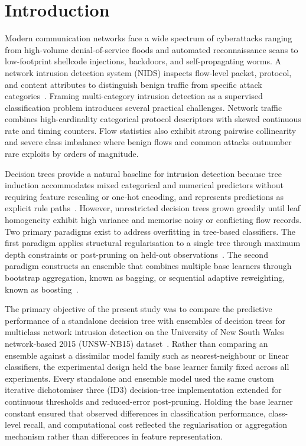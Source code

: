 \section{Introduction}
\label{sec:introduction}

Modern communication networks face a wide spectrum of cyberattacks ranging from high-volume denial-of-service floods and automated reconnaissance scans to low-footprint shellcode injections, backdoors, and self-propagating worms. A network intrusion detection system (NIDS) inspects flow-level packet, protocol, and content attributes to distinguish benign traffic from specific attack categories~\cite{Moustafa2015}. Framing multi-category intrusion detection as a supervised classification problem introduces several practical challenges. Network traffic combines high-cardinality categorical protocol descriptors with skewed continuous rate and timing counters. Flow statistics also exhibit strong pairwise collinearity and severe class imbalance where benign flows and common attacks outnumber rare exploits by orders of magnitude.

Decision trees provide a natural baseline for intrusion detection because tree induction accommodates mixed categorical and numerical predictors without requiring feature rescaling or one-hot encoding, and represents predictions as explicit rule paths~\cite{Kelleher2020,Quinlan1986}. However, unrestricted decision trees grown greedily until leaf homogeneity exhibit high variance and memorise noisy or conflicting flow records. Two primary paradigms exist to address overfitting in tree-based classifiers. The first paradigm applies structural regularisation to a single tree through maximum depth constraints or post-pruning on held-out observations~\cite{Kelleher2020,Quinlan1993}. The second paradigm constructs an ensemble that combines multiple base learners through bootstrap aggregation, known as bagging, or sequential adaptive reweighting, known as boosting~\cite{Breiman1996,Freund1997,Zhu2009}.

The primary objective of the present study was to compare the predictive performance of a standalone decision tree with ensembles of decision trees for multiclass network intrusion detection on the University of New South Wales network-based 2015 (UNSW-NB15) dataset~\cite{Moustafa2015}. Rather than comparing an ensemble against a dissimilar model family such as nearest-neighbour or linear classifiers, the experimental design held the base learner family fixed across all experiments. Every standalone and ensemble model used the same custom iterative dichotomiser three (ID3) decision-tree implementation extended for continuous thresholds and reduced-error post-pruning. Holding the base learner constant ensured that observed differences in classification performance, class-level recall, and computational cost reflected the regularisation or aggregation mechanism rather than differences in feature representation.

